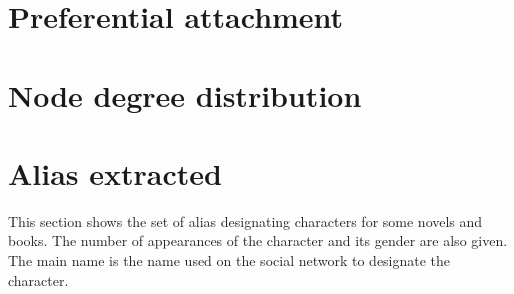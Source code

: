 \documentclass[a4paper, 12pt]{report}
\begin{document}
\begin{appendices}
\chapter{Preferential attachment}
\label{ref_attachement}





\chapter{Node degree distribution}
\label{a_degree}


\chapter{Alias extracted}
This section shows the set of alias designating characters for some novels and books.
The number of appearances of the character and its gender are also given.
The main name is the name used on the social network to designate the character.
\label{alias_extracted}


\end{appendices}
\end{document}
